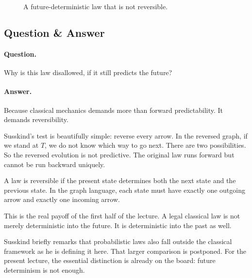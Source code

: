 \begin{figure}
\centering
{}
\caption{A future-deterministic law that is not reversible.}
\end{figure}

\subsection{Question \& Answer}

\paragraph{Question.} Why is this law disallowed, if it still predicts the future?

\paragraph{Answer.} Because classical mechanics demands more than forward predictability. It demands reversibility.

Susskind's test is beautifully simple: reverse every arrow. In the reversed graph, if we stand at \(T\), we do not know which way to go next. There are two possibilities. So the reversed evolution is not predictive. The original law runs forward but cannot be run backward uniquely.

\begin{definition}
A law is reversible if the present state determines both the next state and the previous state. In the graph language, each state must have exactly one outgoing arrow and exactly one incoming arrow.
\end{definition}

This is the real payoff of the first half of the lecture. A legal classical law is not merely deterministic into the future. It is deterministic into the past as well.

Susskind briefly remarks that probabilistic laws also fall outside the classical framework as he is defining it here. That larger comparison is postponed. For the present lecture, the essential distinction is already on the board: future determinism is not enough.

